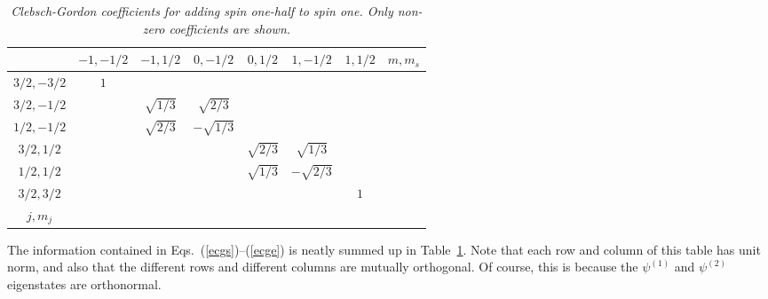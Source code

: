 \begin{table}
\begin{tabular}{c|cccccc|c}
&$-1, -1/2$& $-1, 1/2$&$0,-1/2$&$0,1/2$&$1,-1/2$&$1,1/2$&$m,m_s$\\[0.5ex]\hline
$3/2, -3/2$ & $\scriptstyle{1}$&&&&&\\[0.5ex]
$3/2, -1/2$& &${\scriptstyle\sqrt{1/3}}$&${\scriptstyle\sqrt{2/3}}$&&&&\\[0.5ex]
$1/2, -1/2$& &${\scriptstyle\sqrt{2/3}}$&${\scriptstyle -\sqrt{1/3}}$&&&&\\[0.5ex]
$3/2, 1/2$& &&&${\scriptstyle\sqrt{2/3}}$&${\scriptstyle\sqrt{1/3}}$&&\\[0.5ex]
$1/2, 1/2$& &&&${\scriptstyle\sqrt{1/3}}$&${\scriptstyle - \sqrt{2/3}}$&&\\[0.5ex]
$3/2, 3/2$& &&&&&${\scriptstyle 1}$&\\
\hline
$j, m_j$&&&&&&&
\end{tabular}
\caption{\em Clebsch-Gordon coefficients for adding spin one-half to
spin one. Only non-zero coefficients are shown.}\label{t3}
\end{table}

The information contained in Eqs.~(\ref{ecgs})--(\ref{ecge}) is neatly summed
up in Table~\ref{t3}. Note that each row and column of this
table has unit norm, and also that the different rows and different columns
are mutually orthogonal. Of course, this is because the $\psi^{(1)}$ and
$\psi^{(2)}$ eigenstates are orthonormal.

